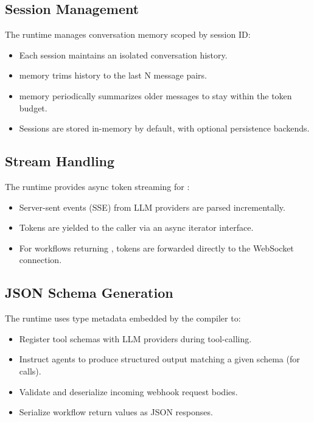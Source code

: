 \subsection{Session Management}

The runtime manages conversation memory scoped by session ID:

\begin{itemize}
    \item Each session maintains an isolated conversation history.
    \item {} memory trims history to the last N message pairs.
    \item {} memory periodically summarizes older messages to stay within the token budget.
    \item Sessions are stored in-memory by default, with optional persistence backends.
\end{itemize}

\subsection{Stream Handling}

The runtime provides async token streaming for :

\begin{itemize}
    \item Server-sent events (SSE) from LLM providers are parsed incrementally.
    \item Tokens are yielded to the caller via an async iterator interface.
    \item For  workflows returning , tokens are forwarded directly to the WebSocket connection.
\end{itemize}

\subsection{JSON Schema Generation}

The runtime uses type metadata embedded by the compiler to:

\begin{itemize}
    \item Register tool schemas with LLM providers during tool-calling.
    \item Instruct agents to produce structured output matching a given schema (for  calls).
    \item Validate and deserialize incoming webhook request bodies.
    \item Serialize workflow return values as JSON responses.
\end{itemize}

